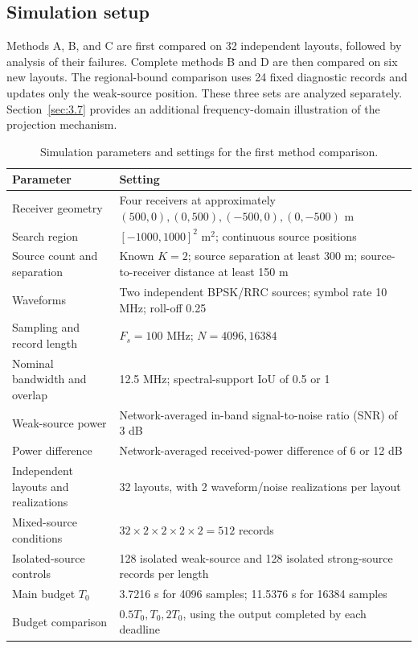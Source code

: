 \documentclass[11pt,a4paper]{article}
\numberwithin{equation}{section}
\numberwithin{figure}{section}
\numberwithin{table}{section}
\begin{document}
\subsection{Simulation setup}\label{sec:3.1}

Methods A, B, and C are first compared on 32 independent layouts, followed by analysis of their failures. Complete methods B and D are then compared on six new layouts. The regional-bound comparison uses 24 fixed diagnostic records and updates only the weak-source position. These three sets are analyzed separately. Section~\ref{sec:3.7} provides an additional frequency-domain illustration of the projection mechanism.

\begin{table}[H]
\centering
\caption{Simulation parameters and settings for the first method comparison.}\label{tab:3.1}
\small
\setlength{\tabcolsep}{4pt}
\renewcommand{\arraystretch}{1.2}
\begin{tabularx}{\linewidth}{Y{0.65}Y{1.35}}
\toprule
\textbf{Parameter} & \textbf{Setting} \\
\midrule
Receiver geometry & Four receivers at approximately $(500,0),(0,500),(-500,0),(0,-500)$ m \\
Search region & $[-1000,1000]^2$ m$^2$; continuous source positions \\
Source count and separation & Known $K=2$; source separation at least 300 m; source-to-receiver distance at least 150 m \\
Waveforms & Two independent BPSK/RRC sources; symbol rate 10 MHz; roll-off 0.25 \\
Sampling and record length & $F_s=100$ MHz; $N=4096,16384$ \\
Nominal bandwidth and overlap & 12.5 MHz; spectral-support IoU of 0.5 or 1 \\
Weak-source power & Network-averaged in-band signal-to-noise ratio (SNR) of 3 dB \\
Power difference & Network-averaged received-power difference of 6 or 12 dB \\
Independent layouts and realizations & 32 layouts, with 2 waveform/noise realizations per layout \\
Mixed-source conditions & $32\times2\times2\times2\times2=512$ records \\
Isolated-source controls & 128 isolated weak-source and 128 isolated strong-source records per length \\
Main budget $T_0$ & 3.7216 s for 4096 samples; 11.5376 s for 16384 samples \\
Budget comparison & $0.5T_0,T_0,2T_0$, using the output completed by each deadline \\
\bottomrule
\end{tabularx}
\end{table}
\end{document}
